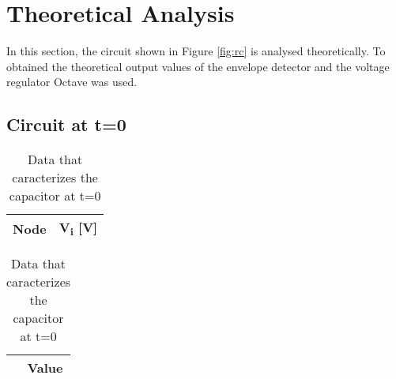 \section{Theoretical Analysis} \label{sec:analysis}

In this section, the circuit shown in Figure \ref{fig:rc} is analysed theoretically.
To obtained the theoretical output values of the envelope detector and the voltage regulator Octave was used. 



\subsection{Circuit at t=0}

\begin{table}[!htb]
    \begin{minipage}{.5\linewidth}
      
      \centering
        \begin{tabular}{|c|c|}
        \hline    
        {\bf Node} & {\bf V\textsubscript{i} [V]} \\ \hline
        
        \end{tabular}
        \caption{Voltage values on each node (t=0)}
    \end{minipage}%
    \begin{minipage}{.5\linewidth}
      \centering
        
        \begin{tabular}{|c|c|}
        \hline    
        {\bf } & {\bf Value} \\ \hline
        
        \end{tabular}
        \caption{Data that caracterizes the capacitor at t=0}
    \end{minipage} 
\end{table}
\newpage




